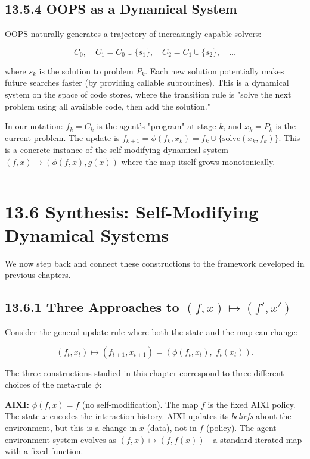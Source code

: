 \subsection{13.5.4 OOPS as a Dynamical System}

OOPS naturally generates a trajectory of increasingly capable solvers:

\[
C_0, \quad C_1 = C_0 \cup \{ s_1\} , \quad C_2 = C_1 \cup \{ s_2\} , \quad \ldots
\]

where $s_k$ is the solution to problem $P_k$. Each new solution potentially makes future searches faster (by providing callable subroutines). This is a dynamical system on the space of code stores, where the transition rule is "solve the next problem using all available code, then add the solution."

In our notation: $f_k = C_k$ is the agent's "program" at stage $k$, and $x_k = P_k$ is the current problem. The update is $f_{k+1} = \phi(f_k, x_k) = f_k \cup \{ \text{solve}(x_k, f_k)\} $. This is a concrete instance of the self-modifying dynamical system $(f, x) \mapsto (\phi(f,x), g(x))$ where the map itself grows monotonically.

\bigskip\hrule\bigskip

\section{13.6 Synthesis: Self-Modifying Dynamical Systems}

We now step back and connect these constructions to the framework developed in previous chapters.

\subsection{13.6.1 Three Approaches to $(f, x) \mapsto (f', x')$}

Consider the general update rule where both the state and the map can change:

\[
(f_t, x_t) \mapsto (f_{t+1}, x_{t+1}) = (\phi(f_t, x_t),\; f_t(x_t)).
\]

The three constructions studied in this chapter correspond to three different choices of the meta-rule $\phi$:

\textbf{AIXI:} $\phi(f, x) = f$ (no self-modification). The map $f$ is the fixed AIXI policy. The state $x$ encodes the interaction history. AIXI updates its \textit{beliefs} about the environment, but this is a change in $x$ (data), not in $f$ (policy). The agent-environment system evolves as $(f, x) \mapsto (f, f(x))$---a standard iterated map with a fixed function.

